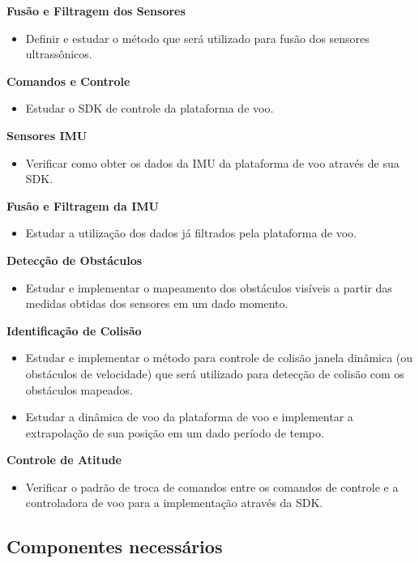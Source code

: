 \documentclass[a4paper, 12pt]{article}
\begin{document}
\noindent\textbf{Fusão e Filtragem dos Sensores} 
\begin{itemize}
	\item
	Definir e estudar o método que será utilizado para fusão dos sensores ultrassônicos.
\end{itemize}

\noindent\textbf{Comandos e Controle} 
\begin{itemize}
	\item
	Estudar o SDK de controle da plataforma de voo.  
\end{itemize}

\noindent\textbf{Sensores IMU} 
\begin{itemize}
	\item
	Verificar como obter os dados da IMU da plataforma de voo através de sua SDK.
\end{itemize}

\noindent\textbf{Fusão e Filtragem da IMU} 
\begin{itemize}
	\item
	Estudar a utilização dos dados já filtrados pela plataforma de voo.  
\end{itemize}

\noindent\textbf{Detecção de Obstáculos} 
\begin{itemize}
	\item
	Estudar e implementar o mapeamento dos obstáculos visíveis a partir das medidas obtidas dos sensores em um dado momento.  
\end{itemize}

\noindent\textbf{Identificação de Colisão} 
\begin{itemize}
	\item
	Estudar e implementar o método para controle de colisão janela dinâmica (ou obstáculos de velocidade) que será utilizado para detecção de colisão com os obstáculos mapeados. 
	\item
	Estudar a dinâmica de voo da plataforma de voo e implementar a extrapolação de sua posição em um dado período de tempo.  
\end{itemize}

\noindent\textbf{Controle de Atitude} 
\begin{itemize}
	\item
	Verificar o padrão de troca de comandos entre os comandos de controle e a controladora de voo para a implementação através da SDK.  
\end{itemize}

\subsection{Componentes necessários}
\end{document}
